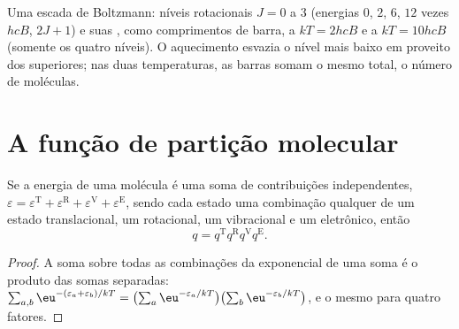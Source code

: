 \begin{omfigure}

{\small Uma escada de Boltzmann: níveis rotacionais $J = 0$ a 3 (energias $0$, $2$, $6$,
$12$ vezes $hcB$,  $2J + 1$) e suas , como comprimentos de
barra, a $kT = 2hcB$ e a $kT = 10hcB$ (somente os quatro níveis). O aquecimento esvazia
o nível mais baixo em proveito dos superiores; nas duas temperaturas, as barras somam
o mesmo total, o número de moléculas.}
\end{omfigure}

\section{A função de partição molecular}

\begin{proposition}[Fatoração]\label{prop:b3:partition-functions:factorisation}
Se a energia de uma molécula é uma soma de contribuições independentes,
$\varepsilon = \varepsilon^{\mathrm T} + \varepsilon^{\mathrm R} + \varepsilon^{\mathrm V} + \varepsilon^{\mathrm E}$, sendo cada estado
uma combinação qualquer de um estado translacional, um rotacional, um vibracional
e um eletrônico, então
\[
  q = q^{\mathrm T}q^{\mathrm R}q^{\mathrm V}q^{\mathrm E}.
\]
\end{proposition}

\begin{proof}
A soma sobre todas as combinações da exponencial de uma soma é o produto das
somas separadas: $\sum_{a,b}\eu^{-(\varepsilon_a+\varepsilon_b)/kT} = \bigl(\sum_a\eu^{-\varepsilon_a/kT}\bigr)
\bigl(\sum_b\eu^{-\varepsilon_b/kT}\bigr)$, e o mesmo para quatro fatores.
\end{proof}

